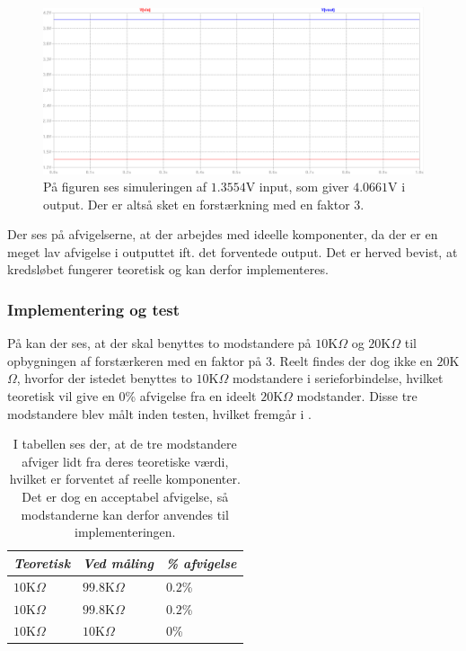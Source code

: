 \begin{figure}[H]
	\centering
	\includegraphics[scale=0.4]{figures/cProblemloesning/Forstaerker_faktor3_simulering.PNG}
	\caption{På figuren ses simuleringen af $1.3554$V input, som giver $4.0661$V i output. Der er altså sket en forstærkning med en faktor $3$.}
	\label{fig:faktor3_simulering}
\end{figure}
\noindent Der ses på afvigelserne, at der arbejdes med ideelle komponenter, da der er en meget lav afvigelse i outputtet ift. det forventede output. Det er herved bevist, at kredsløbet fungerer teoretisk og kan derfor implementeres.

\subsubsection{Implementering og test}
På  kan der ses, at der skal benyttes to modstandere på $10$K$\Omega$ og $20$K$\Omega$ til opbygningen af forstærkeren med en faktor på 3. Reelt findes der dog ikke en $20$K$\Omega$, hvorfor der istedet benyttes to $10$K$\Omega$ modstandere i serieforbindelse, hvilket teoretisk vil give en $0$\% afvigelse fra en ideelt $20$K$\Omega$ modstander. Disse tre modstandere blev målt inden testen, hvilket fremgår i .
\begin{table}[H]
	\centering
	\begin{tabular}{|l|l|l|}
		\hline
		\textit{Teoretisk}  & \textit{Ved måling} & \textit{\% afvigelse} \\ \hline
		$10$K$\Omega$       & $99.8$K$\Omega$     & $0.2$\%               \\ \hline
		$10$K$\Omega$       & $99.8$K$\Omega$     & $0.2$\%               \\ \hline
		$10$K$\Omega$       & $10$K$\Omega$       & $0$\%               \\ \hline
	\end{tabular}
	\caption{I tabellen ses der, at de tre modstandere afviger lidt fra deres teoretiske værdi, hvilket er forventet af reelle komponenter. Det er dog en acceptabel afvigelse, så modstanderne kan derfor anvendes til implementeringen.}
	\label{Tab:modstand_faktor18}
\end{table}

